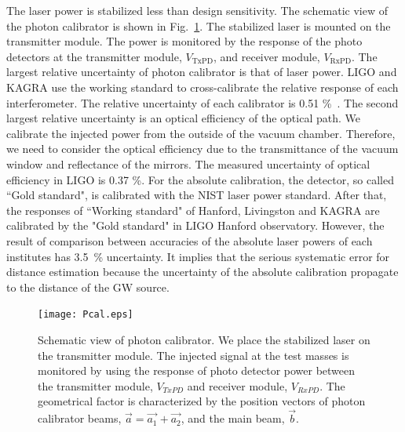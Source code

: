 \documentclass[A4]{spie}  %
\begin{document}
The laser power is stabilized less than design sensitivity. The schematic view of the photon calibrator is shown in Fig.~\ref{fig:Pcal}. The stabilized laser is mounted on the transmitter module. The power is monitored by the response of the photo detectors at the transmitter module, $V_{\mathrm{TxPD}}$, and receiver module, $V_{\mathrm{RxPD}}$.  
The largest relative uncertainty of photon calibrator is that of laser power.
LIGO and KAGRA use the working standard to cross-calibrate the relative response of each interferometer. The relative uncertainty of  each  calibrator is 0.51 \%~\cite{doi:10.1063/1.4967303}. 
The second largest relative uncertainty is an optical efficiency of the optical path. We calibrate the injected power from the outside of the vacuum chamber. Therefore, we need to consider the optical efficiency due to the transmittance of the vacuum window and reflectance of the mirrors. The measured uncertainty of optical efficiency in LIGO is 0.37 \%. 
For the absolute calibration, the detector, so called ``Gold standard", is calibrated with the NIST laser power standard. After that, the responses of ``Working standard" of Hanford, Livingston and KAGRA are calibrated by the "Gold standard" in LIGO Hanford observatory. 
However, the result of comparison between accuracies of the absolute laser powers of each institutes has 3.5~\% uncertainty. It implies that the serious systematic error for distance estimation because the uncertainty of the absolute calibration propagate to the distance of the GW source.

\begin{figure}
\begin{center}
\texttt{[image: Pcal.eps]}
\caption{Schematic view of photon calibrator. We place the stabilized laser on the transmitter module. The injected signal at the test masses is monitored by using the response of photo detector power between the transmitter module, $V_{TxPD}$ and  receiver module, $V_{RxPD}$.  The geometrical factor is characterized by the position vectors of photon calibrator beams, $\vec{a}=\vec{a_1}+\vec{a_2}$, and the main beam, $\vec{b}$.}
\label{fig:Pcal}
\end{center}
\end{figure}
\end{document}
